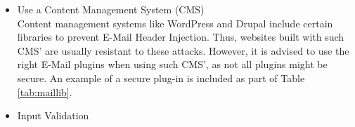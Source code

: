 \begin{itemize}
	\item Use a Content Management System (CMS) \\
	Content management systems like WordPress and Drupal include certain libraries to prevent E-Mail Header Injection. Thus, websites built with such CMS' are usually resistant to these attacks. However, it is advised to use the right E-Mail plugins when using such CMS', as not all plugins might be secure.
	An example of a secure plug-in is included as part of Table \ref{tab:maillib}.
	
	\item Input Validation
	
\end{itemize}


